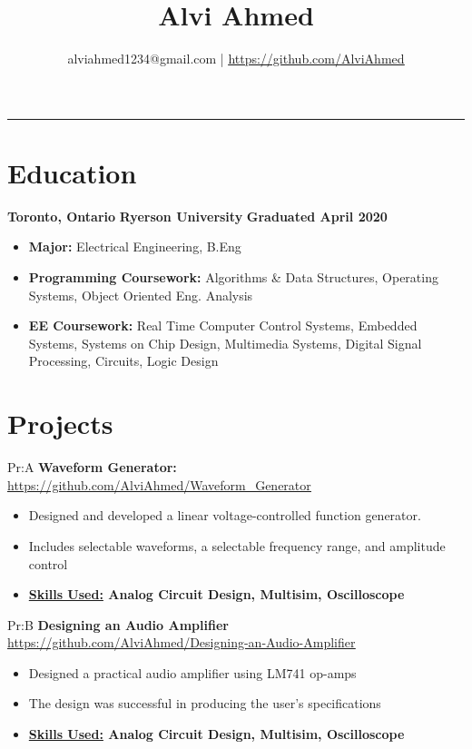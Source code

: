 \documentclass[11pt]{article}
\title{
	Alvi Ahmed
}
\author{alviahmed1234@gmail.com | \underline{\url{https://github.com/AlviAhmed}}}
\newcommand{\uniname}{Ryerson University}
\newcommand{\unigrad}{Graduated April 2020}
\newcommand{\uniloc}{Toronto, Ontario}
\newcommand{\uni}[3]{
  \begin{flushleft}
    {\small\bfseries #1}
    \hfill
    {\small\bfseries #2}
    \hfill
    {\small\bfseries #3}
\end{flushleft}
  \vspace{-0.7em}
}
\renewcommand{\maketitle}{
    \begin{center}
    \phantom{.} %
    \vspace{-2em}
    	{\Huge\bfseries \thetitle}
    	\vspace{-0.5em}
		\par\noindent\rule{\textwidth}{2pt}
	\end{center} 
	\begin{center} 
		\vspace{-1em}  
		{\small\theauthor}
	\end{center}
}
\begin{document}

\maketitle    

\section*{Education}
	\uni{\uniloc}{\uniname}{\unigrad}
	\begin{itemize}[noitemsep,nolistsep]   
		\item \textbf{Major:} Electrical Engineering, B.Eng
        \item \textbf{Programming Coursework: } Algorithms \& Data Structures,
           Operating Systems, Object Oriented Eng. Analysis 
        \item \textbf{EE Coursework: } Real Time Computer Control Systems,
          Embedded Systems, Systems on Chip Design, Multimedia Systems,
          Digital Signal Processing, Circuits, Logic Design
        \end{itemize}
        \section*{Projects}



Pr:A
\textbf{Waveform Generator: }
\underline{\url{https://github.com/AlviAhmed/Waveform_Generator}}
\begin{itemize}[noitemsep,nolistsep]
\item Designed and developed a linear voltage-controlled function generator. 
\item Includes selectable waveforms, a selectable frequency range, and amplitude control
\item \textbf{ \underline{Skills Used:} Analog Circuit Design, Multisim, Oscilloscope}
\end{itemize}            



Pr:B
\textbf{Designing an Audio Amplifier}
\underline{\url{https://github.com/AlviAhmed/Designing-an-Audio-Amplifier}}
\begin{itemize}[noitemsep,nolistsep]
\item Designed a practical audio amplifier using LM741 op-amps
\item The design was successful in producing the user's specifications
\item \textbf{ \underline{Skills Used:} Analog Circuit Design, Multisim, Oscilloscope}
\end{itemize}
\end{document}
